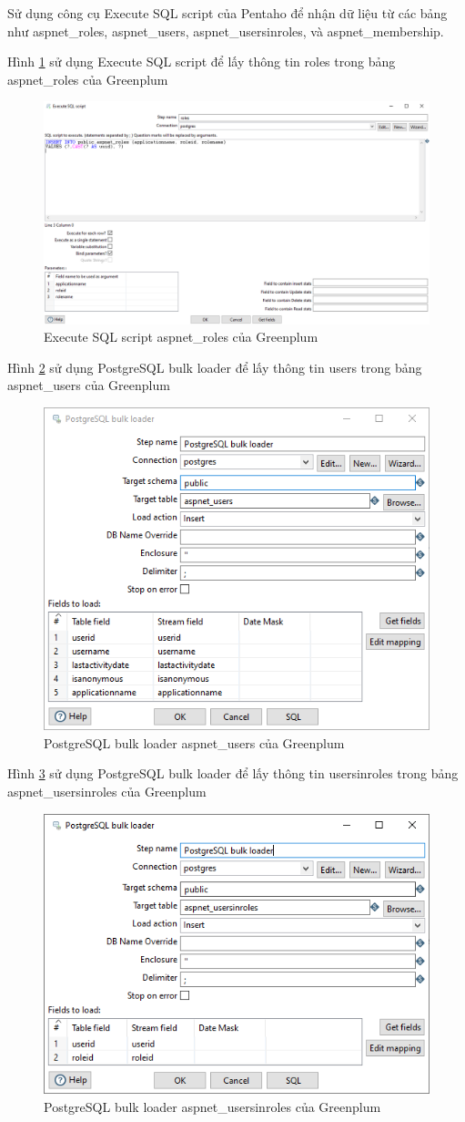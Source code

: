 \documentclass{article}[14pt]
\begin{document}
Sử dụng công cụ Execute SQL script của Pentaho để nhận dữ liệu từ các bảng như aspnet\_roles, aspnet\_users, aspnet\_usersinroles, và aspnet\_membership.

Hình \ref{fig:groles} sử dụng Execute SQL script để lấy thông tin roles trong bảng aspnet\_roles của Greenplum


\begin{figure}
    \centering
    \includegraphics[width=0.5\linewidth]{images/groles.png}
     \caption{Execute SQL script aspnet\_roles của Greenplum}
    \label{fig:groles}
\end{figure}

Hình \ref{fig:bulk_users1} sử dụng PostgreSQL bulk loader để lấy thông tin users trong bảng aspnet\_users của Greenplum


\begin{figure}
    \centering
    \includegraphics[width=0.5\linewidth]{images/bulk_users1.png}
     \caption{PostgreSQL bulk loader aspnet\_users của Greenplum}
    \label{fig:bulk_users1}
\end{figure}

Hình \ref{fig:Bulk_uir} sử dụng PostgreSQL bulk loader để lấy thông tin usersinroles trong bảng aspnet\_usersinroles của Greenplum


\begin{figure}
    \centering
    \includegraphics[width=0.5\linewidth]{images/Bulk_uir.png}
    \caption{PostgreSQL bulk loader aspnet\_usersinroles của Greenplum}
    \label{fig:Bulk_uir}
\end{figure}
\end{document}
